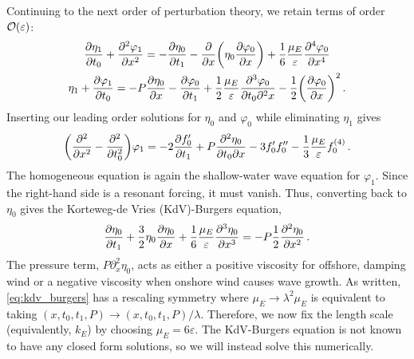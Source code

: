 \documentclass{jfm}
\renewcommand*{\epsilon}{\varepsilon}
\begin{document}
Continuing to the next order of perturbation theory, we retain terms of
order $\order{\epsilon}$:
\begin{gather}
    \pdv{\eta_1}{t_0} + \pdv[2]{\varphi_{1}}{x} =
      -\pdv{\eta_0}{t_1} - \pdv{x} \pqty{\eta_0 \pdv{\varphi_0}{x}} +
      \frac{1}{6} \frac{\mu_E}{\epsilon} \pdv[4]{\varphi_0}{x}
  \\
    \eta_1 + \pdv{\varphi_1}{t_0} = -P \pdv{\eta_0}{x} -\pdv{\varphi_0}{t_1}
      + \frac{1}{2} \frac{\mu_E}{\epsilon} \frac{\partial^3 \varphi_0}
        {\partial t_0 \partial^2 x}
      - \frac{1}{2} \pqty{ \pdv{\varphi_0}{x} }^2
  \,.
\end{gather}
Inserting our leading order solutions for $\eta_0$ and $\varphi_0$ while
eliminating $\eta_1$ gives
\begin{equation}
  \pqty{\pdv[2]{x} - \pdv[2]{t_0}} \varphi_1 = -2 \pdv{f_0'}{t_1} +
    P\pdv{\eta_0}{t_0}{x} - 3 f_0' f_0'' - \frac{1}{3} \frac{\mu_E}{\epsilon}
    f_0^{(4)} \,.
\end{equation}
The homogeneous equation is again the shallow-water wave equation for
$\varphi_1$.
Since the right-hand side is a resonant forcing, it must vanish.
Thus, converting back to $\eta_0$ gives the Korteweg-de Vries
(KdV)-Burgers equation,
\begin{equation}
  \pdv{\eta_0}{t_1} + \frac{3}{2}
    \eta_0 \pdv{\eta_0}{x} + \frac{1}{6} \frac{\mu_E}{\epsilon}
    \pdv[3]{\eta_0}{x} = -P \frac{1}{2} \pdv[2]{\eta_0}{x} \,.
  \label{eq:kdv_burgers}
\end{equation}
The pressure term, $P \partial^2_x \eta_0$, acts as either a positive
viscosity for offshore, damping wind or a negative viscosity when
onshore wind causes wave growth.
As written, \cref{eq:kdv_burgers} has a rescaling symmetry where $\mu_E
\to \lambda^2 \mu_E$ is equivalent to taking $(x,t_0,t_1,P) \to
(x,t_0,t_1,P)/\lambda$.
Therefore, we now fix the length scale (equivalently, $k_E$) by choosing
$\mu_E = 6 \epsilon$.
The KdV-Burgers equation is not known to have any closed form solutions,
so we will instead solve this numerically.
\end{document}

